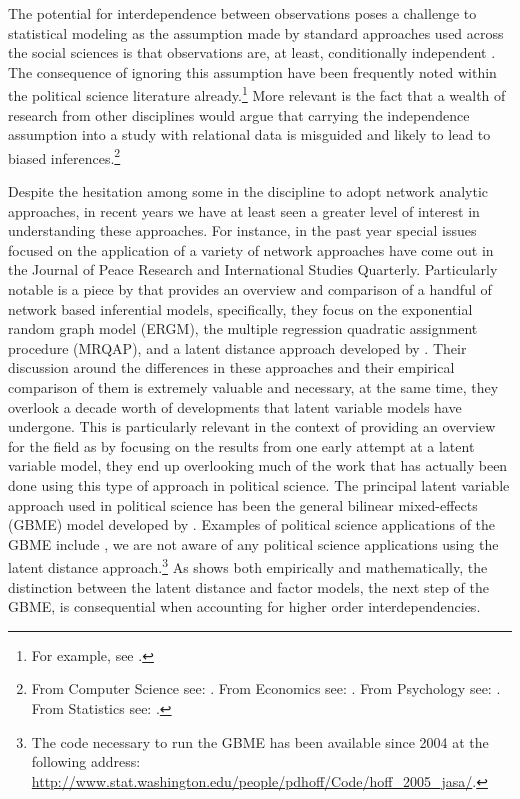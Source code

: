 The potential for interdependence between observations poses a challenge to statistical modeling as the assumption made by standard approaches used across the social sciences is that observations are, at least, conditionally independent \citep{snijders:2011}. The consequence of ignoring this assumption have been frequently noted within the political science literature already.\footnote{For example, see \citet{beck:etal:1998,signorino:1999,hoff:ward:2004,franzese:hayes:2007,cranmer:desmarais:2011,erikson:pinto:2014}.} More relevant is the fact that a wealth of research from other disciplines would argue that carrying the independence assumption into a study with relational data is misguided and likely to lead to biased inferences.\footnote{From Computer Science see: \citet{bonabeau:2002,brandes:erlebach:2005}. From Economics see: \citet{goyal:2012,jackson:2014}. From Psychology see: \citet{pattison:wasserman:1999,kenny:etal:2006}. From Statistics see: \citet{snijders:1996,hoff:etal:2002}.} 

Despite the hesitation among some in the discipline to adopt network analytic approaches, in recent years we have at least seen a greater level of interest in understanding these approaches. For instance, in the past year special issues focused on the application of a variety of network approaches have come out in the Journal of Peace Research and International Studies Quarterly. Particularly notable is a piece by \citet{cranmer:etal:2016} that provides an overview and comparison of a handful of network based inferential models, specifically, they focus on the exponential random graph model (ERGM), the multiple regression quadratic assignment procedure (MRQAP), and a latent distance approach developed by \citet{hoff:etal:2002}. Their discussion around the differences in these approaches and their empirical comparison of them is extremely valuable and necessary, at the same time, they overlook a decade worth of developments that latent variable models have undergone. This is particularly relevant in the context of providing an overview for the field as by focusing on the results from one early attempt at a latent variable model, they end up overlooking much of the work that has actually been done using this type of approach in political science. The principal latent variable approach used in political science has been the general bilinear mixed-effects (GBME) model developed by \citet{hoff:2005}. Examples of political science applications of the GBME include \citet{hoff:ward:2004,ward:etal:2007,metternich:etal:2015}, we are not aware of any political science applications using the latent distance approach.\footnote{The code necessary to run the GBME has been available since 2004 at the following address: \url{http://www.stat.washington.edu/people/pdhoff/Code/hoff_2005_jasa/}.} As \citet{hoff:2008} shows both empirically and mathematically, the distinction between the latent distance and factor models, the next step of the GBME, is consequential when accounting for higher order interdependencies.

